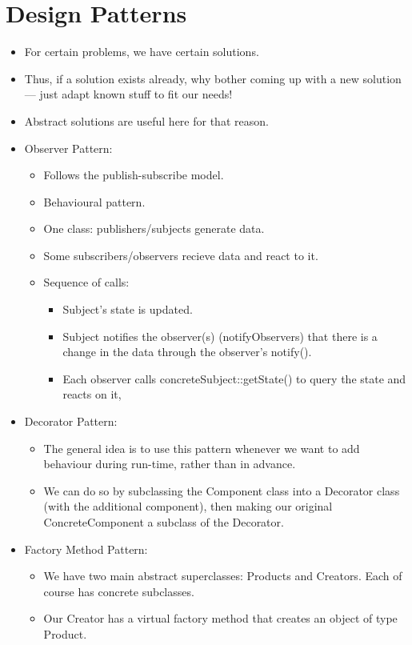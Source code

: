 \documentclass{article}
\begin{document}
\section{Design Patterns}
\begin{itemize}
\item For certain problems, we have certain solutions.  
\item Thus, if a solution exists already, why bother coming up with a new solution --- just adapt known stuff to fit our needs!
\item Abstract solutions are useful here for that reason.
\item Observer Pattern:
\begin{itemize}
\item Follows the publish-subscribe model.
\item Behavioural pattern.
\item One class: publishers/subjects generate data.
\item Some subscribers/observers recieve data and react to it.
\item Sequence of calls:
\begin{itemize}
\item Subject's state is updated.
\item Subject notifies the observer(s) (notifyObservers) that there is a change in the data through the observer's notify().
\item Each observer calls concreteSubject::getState() to query the state and reacts on it,
\end{itemize}
\end{itemize}
\item Decorator Pattern:
\begin{itemize}
\item The general idea is to use this pattern whenever we want to add behaviour during run-time, rather than in advance.
\item We can do so by subclassing the Component class into a Decorator class (with the additional component), then making our original ConcreteComponent a subclass of the Decorator.
\end{itemize}
\item Factory Method Pattern:
\begin{itemize}
\item We have two main abstract superclasses: Products and Creators.  Each of course has concrete subclasses.
\item Our Creator has a virtual factory method that creates an object of type Product.

\end{itemize}
\end{itemize}
\end{document}
